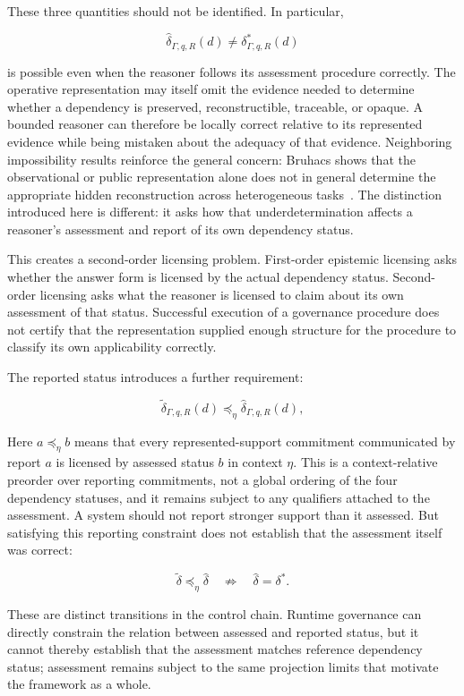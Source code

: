 \documentclass[11pt]{article}
\theoremstyle{definition}
\theoremstyle{remark}
\begin{document}
These three quantities should not be identified. In particular,

\[
\widehat{\delta}_{\Gamma,q,R}(d)
\neq
\delta^{*}_{\Gamma,q,R}(d)
\]

is possible even when the reasoner follows its assessment procedure correctly. The operative representation may itself omit the evidence needed to determine whether a dependency is preserved, reconstructible, traceable, or opaque. A bounded reasoner can therefore be locally correct relative to its represented evidence while being mistaken about the adequacy of that evidence. Neighboring impossibility results reinforce the general concern: Bruhacs shows that the observational or public representation alone does not in general determine the appropriate hidden reconstruction across heterogeneous tasks~\cite{Bruhacs2026Limits}. The distinction introduced here is different: it asks how that underdetermination affects a reasoner's assessment and report of its own dependency status.

This creates a second-order licensing problem. First-order epistemic licensing asks whether the answer form is licensed by the actual dependency status. Second-order licensing asks what the reasoner is licensed to claim about its own assessment of that status. Successful execution of a governance procedure does not certify that the representation supplied enough structure for the procedure to classify its own applicability correctly.

The reported status introduces a further requirement:

\[
\widetilde{\delta}_{\Gamma,q,R}(d)
\preceq_{\eta}
\widehat{\delta}_{\Gamma,q,R}(d),
\]

Here \(a\preceq_{\eta}b\) means that every represented-support commitment communicated by report \(a\) is licensed by assessed status \(b\) in context \(\eta\). This is a context-relative preorder over reporting commitments, not a global ordering of the four dependency statuses, and it remains subject to any qualifiers attached to the assessment. A system should not report stronger support than it assessed. But satisfying this reporting constraint does not establish that the assessment itself was correct:

\[
\widetilde{\delta}
\preceq_{\eta}
\widehat{\delta}
\quad\not\Rightarrow\quad
\widehat{\delta}=\delta^{*}.
\]

These are distinct transitions in the control chain. Runtime governance can directly constrain the relation between assessed and reported status, but it cannot thereby establish that the assessment matches reference dependency status; assessment remains subject to the same projection limits that motivate the framework as a whole.
\end{document}
